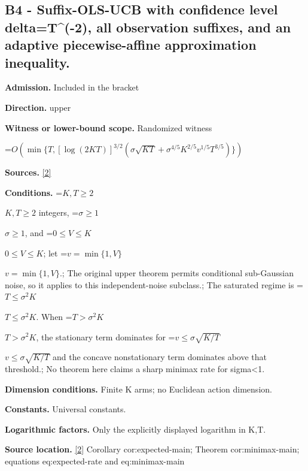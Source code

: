 \documentclass[10pt,a4paper]{article}
\newcommand{\AtlasMath}[1]{\par\begingroup\centering\setbox0=\hbox{$\displaystyle #1$}\ifdim\wd0>1.4\linewidth\typeout{ATLAS WIDE FORMULA: \the\wd0}\fi\ifdim\wd0>\linewidth\resizebox{\linewidth}{!}{\box0}\else\box0\fi\par\endgroup}
\newcommand{\AtlasInlineMath}[1]{\begingroup\setbox0=\hbox{$#1$}\ifdim\wd0>.4\linewidth\endgroup\AtlasMath{#1}\else\endgroup$#1$\fi}
\begin{document}
\subsection{B4 - Suffix-OLS-UCB with confidence level delta=T\textasciicircum{}(-2), all observation suffixes, and an adaptive piecewise-affine approximation inequality.}


\textbf{Admission.} Included in the bracket



\textbf{Direction.} upper



\textbf{Witness or lower-bound scope.} Randomized witness



\AtlasMath{O\!\left(\min\{T,[\log(2KT)]^{3/2}(\sigma\sqrt{KT}+\sigma^{4/5}K^{2/5}v^{1/5}T^{3/5})\}\right)}


\textbf{Sources.} \href{https://github.com/WU-Wendao/Colombo/blob/main/colombo_sensorium/Complexity_altas/data/sources/colombo/U12/manuscript.pdf}{[2]}



\textbf{Conditions.} \AtlasInlineMath{K,T\ge2} integers, \AtlasInlineMath{\sigma\ge1}, and \AtlasInlineMath{0\le V\le K}; let \AtlasInlineMath{v=\min\{1,V\}}.; The original upper theorem permits conditional sub-Gaussian noise, so it applies to this independent-noise subclass.; The saturated regime is \AtlasInlineMath{T\le\sigma^2K}. When \AtlasInlineMath{T>\sigma^2K}, the stationary term dominates for \AtlasInlineMath{v\le\sigma\sqrt{K/T}} and the concave nonstationary term dominates above that threshold.; No theorem here claims a sharp minimax rate for sigma<1.



\textbf{Dimension conditions.} Finite K arms; no Euclidean action dimension.



\textbf{Constants.} Universal constants.



\textbf{Logarithmic factors.} Only the explicitly displayed logarithm in K,T.



\textbf{Source location.} \href{https://github.com/WU-Wendao/Colombo/blob/main/colombo_sensorium/Complexity_altas/data/sources/colombo/U12/manuscript.pdf}{[2]} Corollary cor:expected-main; Theorem cor:minimax-main; equations eq:expected-rate and eq:minimax-main
\end{document}
